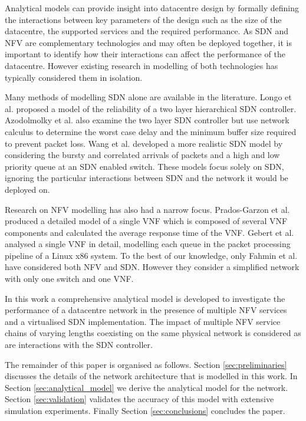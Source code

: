 Analytical models can provide insight into datacentre design by formally defining the interactions between key parameters of the design such as the size of the datacentre, the supported services and the required performance. As SDN and NFV are complementary technologies and may often be deployed together, it is important to identify how their interactions can affect the performance of the datacentre. However existing research in modelling of both technologies has typically considered them in isolation.

Many methods of modelling SDN alone are available in the literature. Longo et al. \cite{LongoDBS15} proposed a model of the reliability of a two layer hierarchical SDN controller. Azodolmolky et al. \cite{AzodolmolkyWY13} also examine the two layer SDN controller but use network calculus to determine the worst case delay and the minimum buffer size required to prevent packet loss. Wang et al. \cite{MiaoMWWH16} developed a more realistic SDN model by considering the bursty and correlated arrivals of packets and a high and low priority queue at an SDN enabled switch. These models focus solely on SDN, ignoring the particular interactions between SDN and the network it would be deployed on.

Research on NFV modelling has also had a narrow focus. Prados-Garzon et al. \cite{Prados-GarzonAR17} produced a detailed model of a single VNF which is composed of several VNF components and calculated the average response time of the VNF. Gebert et al. \cite{GebertZLST16} analysed a single VNF in detail, modelling each queue in the packet processing pipeline of a Linux x86 system. To the best of our knowledge, only Fahmin et al. \cite{FahminLHLS17} have considered both NFV and SDN. However they consider a simplified network with only one switch and one VNF.

In this work a comprehensive analytical model is developed to investigate the performance of a datacentre network in the presence of multiple NFV services and a virtualised SDN implementation. The impact of multiple NFV service chains of varying lengths coexisting on the same physical network is considered as are interactions with the SDN controller.

The remainder of this paper is organised as follows. Section \ref{sec:preliminaries} discusses the details of the network architecture that is modelled in this work. In Section \ref{sec:analytical_model} we derive the analytical model for the network. Section \ref{sec:validation} validates the accuracy of this model with extensive simulation experiments. Finally Section \ref{sec:conclusions} concludes the paper. 